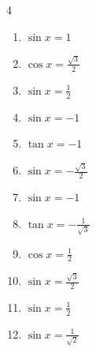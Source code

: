 \begin{multicols}{4}
\begin{enumerate}
  \item $\displaystyle \sin{x}  = 1$


  \item $\displaystyle \cos{x}  = \frac{\sqrt{3}}{2}$


  \item $\displaystyle \sin{x}  = \frac{1}{2}$


  \item $\displaystyle \sin{x}  = -1$


  \item $\displaystyle \tan{x}  = -1$


  \item $\displaystyle \sin{x}  = -\frac{\sqrt{3}}{2}$


  \item $\displaystyle \sin{x}  = -1$


  \item $\displaystyle \tan{x}  = -\frac{1}{\sqrt{3}}$


  \item $\displaystyle \cos{x}  = \frac{1}{2}$


  \item $\displaystyle \sin{x}  = \frac{\sqrt{3}}{2}$


  \item $\displaystyle \sin{x}  = \frac{1}{2}$


  \item $\displaystyle \sin{x}  = \frac{1}{\sqrt{2}}$


\end{enumerate}
\end{multicols}
